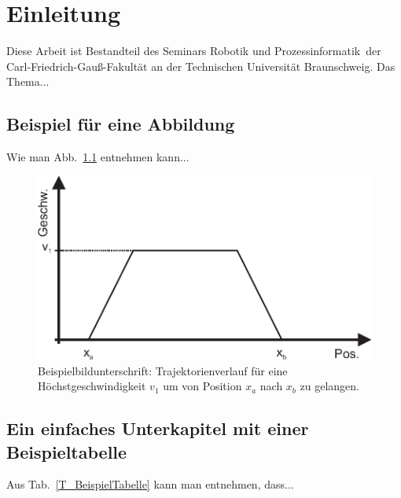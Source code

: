 \documentclass[german, 10pt]{report}
\begin{document}
\thispagestyle{empty}
\newpage

\tableofcontents \thispagestyle{headings}
\setlength{\baselineskip}{3ex}




\chapter{Einleitung}
\label{C_Einleitung}Diese Arbeit ist
Bestandteil des Seminars \glqq Robotik und Prozessinformatik\grqq \
der Carl-Friedrich-Gau{\ss}-Fakult\"{a}t an der Technischen Universit\"{a}t
Braunschweig. Das Thema...


\section{Beispiel f\"{u}r eine Abbildung}
\label{S_AbbBeispiel}Wie man Abb.~\ref{F_BeispielBild} entnehmen
kann...

\begin{figure}
    \centering
    \includegraphics[width=0.6\linewidth]{BeispielBild.eps}
    \caption{\label{F_BeispielBild}Beispielbildunterschrift: Trajektorienverlauf f\"{u}r eine H\"{o}chstgeschwindigkeit $v_1$ um von Position $x_a$ nach $x_b$ zu gelangen.}
\end{figure}


\section{Ein einfaches Unterkapitel mit einer Beispieltabelle}
\label{S_Unterkapitel}Aus Tab.~\ref{T_BeispielTabelle} kann man
entnehmen, dass...
\end{document}
